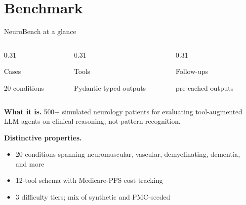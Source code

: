 \documentclass[aspectratio=169,t]{beamer}
\begin{document}
\section{Benchmark}

\begin{frame}{NeuroBench at a glance}
  \begin{columns}[T,onlytextwidth]
    \begin{column}{0.31\textwidth}
      \begin{block}{Cases}
        \centering

        \vspace{0.3mm}
        {\footnotesize 20 conditions}
      \end{block}
    \end{column}%
    \hfill
    \begin{column}{0.31\textwidth}
      \begin{exampleblock}{Tools}
        \centering

        \vspace{0.3mm}
        {\footnotesize Pydantic-typed outputs}
      \end{exampleblock}
    \end{column}%
    \hfill
    \begin{column}{0.31\textwidth}
      \begin{alertblock}{Follow-ups}
        \centering

        \vspace{0.3mm}
        {\footnotesize pre-cached outputs}
      \end{alertblock}
    \end{column}
  \end{columns}

  \vspace{2mm}
  \footnotesize
  \textbf{What it is.} 500+ simulated neurology patients for evaluating
  \alert{tool-augmented} LLM agents on clinical reasoning, not pattern
  recognition.

  \vspace{1.5mm}
  \textbf{Distinctive properties.}
  \begin{itemize}\setlength\itemsep{0.1em}
    \item \alert{20 conditions} spanning neuromuscular, vascular,
          demyelinating, dementia, and more
    \item 12-tool schema with Medicare-PFS cost tracking
    \item 3 difficulty tiers; mix of synthetic and PMC-seeded
  \end{itemize}
\end{frame}
\end{document}
